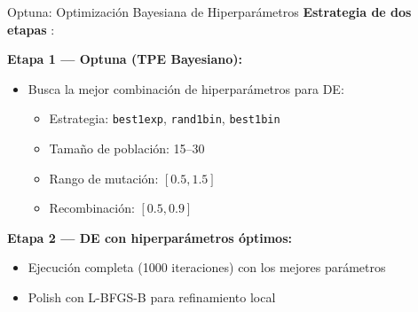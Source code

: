 \documentclass[xcolor={table,dvipsnames}]{beamer}
\begin{document}
\begin{frame}{Optuna: Optimizaci\'on Bayesiana de Hiperpar\'ametros}
    \scriptsize
    \textbf{Estrategia de dos etapas} \cite{akiba2019optuna}:
    \vspace{0.2cm}

    \textbf{Etapa 1 --- Optuna (TPE Bayesiano):}
    \begin{itemize}
        \item Busca la mejor combinaci\'on de hiperpar\'ametros para DE:
        \begin{itemize}
            \scriptsize
            \item Estrategia: \texttt{best1exp}, \texttt{rand1bin}, \texttt{best1bin}
            \item Tama\~no de poblaci\'on: 15--30
            \item Rango de mutaci\'on: $[0.5, 1.5]$
            \item Recombinaci\'on: $[0.5, 0.9]$
        \end{itemize}
    \end{itemize}

    \vspace{0.2cm}
    \textbf{Etapa 2 --- DE con hiperpar\'ametros \'optimos:}
    \begin{itemize}
        \item Ejecuci\'on completa (1000 iteraciones) con los mejores par\'ametros
        \item Polish con L-BFGS-B para refinamiento local
    \end{itemize}

    \vspace{0.2cm}
    \begin{center}
    \end{center}
\end{frame}
\end{document}
